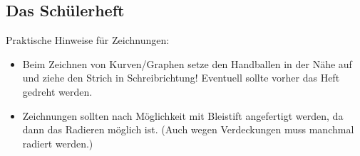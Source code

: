 \subsection{Das Sch\"{u}lerheft}

Praktische Hinweise f\"{u}r Zeichnungen:
\begin{itemize}
\item
Beim Zeichnen von Kurven/Graphen setze den Handballen in der
N\"{a}he auf und ziehe den Strich in Schreibrichtung!
Eventuell sollte vorher das Heft gedreht werden.

\item
Zeichnungen sollten nach M\"{o}glichkeit mit
Bleistift angefertigt werden,
da dann das Radieren m\"{o}glich ist.
(Auch wegen Verdeckungen muss manchmal radiert werden.)
\end{itemize}

